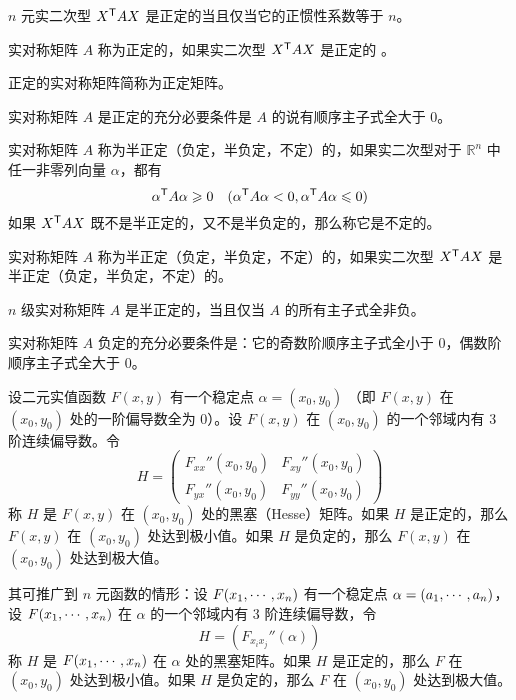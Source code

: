 \begin{theorem}
	$n$ 元实二次型 ${X}^\mathsf{T}AX$ 是正定的当且仅当它的正惯性系数等于 $n$。
\end{theorem}

\begin{definition}
	实对称矩阵 $A$ 称为正定的，如果实二次型 ${X}^\mathsf{T}AX$ 是正定的 。
\end{definition}

正定的实对称矩阵简称为正定矩阵。

\begin{theorem}
	实对称矩阵 $A$ 是正定的充分必要条件是 $A$ 的说有顺序主子式全大于 $0$。
\end{theorem}

\begin{definition}
	实对称矩阵 $A$ 称为半正定（负定，半负定，不定）的，如果实二次型对于 $\mathbb{R}^n$ 中任一非零列向量 $\alpha$，都有
	\[{\alpha}^\mathsf{T}A\alpha \geqslant 0 \quad ({\alpha}^\mathsf{T}A\alpha<0,{\alpha}^\mathsf{T}A\alpha\leqslant 0)\]
	如果 ${X}^\mathsf{T}AX$ 既不是半正定的，又不是半负定的，那么称它是不定的。
\end{definition}

\begin{definition}
	实对称矩阵 $A$ 称为半正定（负定，半负定，不定）的，如果实二次型 ${X}^\mathsf{T}AX$ 是半正定（负定，半负定，不定）的。
\end{definition}

\begin{theorem}
	$n$ 级实对称矩阵 $A$ 是半正定的，当且仅当 $A$ 的所有主子式全非负。
\end{theorem}

\begin{theorem}
	实对称矩阵 $A$ 负定的充分必要条件是：它的奇数阶顺序主子式全小于 $0$，偶数阶顺序主子式全大于 $0$。
\end{theorem}

\begin{theorem}
	设二元实值函数 $F(x,y)$ 有一个稳定点 $\alpha=(x_0,y_0)$ （即 $F(x,y)$ 在 $(x_0,y_0)$ 处的一阶偏导数全为 $0$）。设 $F(x,y)$ 在 $(x_0,y_0)$ 的一个邻域内有 3 阶连续偏导数。令
	\[H = \left(\begin{matrix}
				F_{xx}''(x_0,y_0) & F_{xy}''(x_0,y_0)  \\
				F_{yx}''(x_0,y_0) & F_{yy}''(x_0,y_0)
			\end{matrix}\right)\]
	称 $H$ 是 $F(x,y)$ 在 $(x_0,y_0)$ 处的黑塞（Hesse）矩阵。如果 $H$ 是正定的，那么 $F(x,y)$ 在 $(x_0,y_0)$ 处达到极小值。如果 $H$ 是负定的，那么 $F(x,y)$ 在 $(x_0,y_0)$ 处达到极大值。
\end{theorem}

其可推广到 $n$ 元函数的情形：设 $F(x_1,\cdots,x_n)$ 有一个稳定点 $\alpha = (a_1,\cdots,a_n)$，设 $F(x_1,\cdots,x_n)$ 在 $\alpha$ 的一个邻域内有 3 阶连续偏导数，令
\[H = (F_{x_ix_j}''(\alpha))\]
称 $H$ 是 $F(x_1,\cdots,x_n)$ 在 $\alpha$ 处的黑塞矩阵。如果 $H$ 是正定的，那么 $F$ 在 $(x_0,y_0)$ 处达到极小值。如果 $H$ 是负定的，那么 $F$ 在 $(x_0,y_0)$ 处达到极大值。